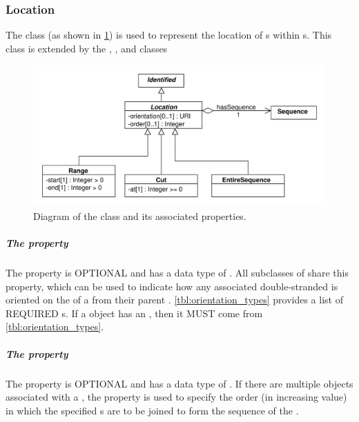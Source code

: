 
\subsubsection{Location}
\label{sec:Location}

The  class (as shown in \ref{uml:location}) is used to represent the location of s within s.  This class is extended by the , , and  classes

\begin{figure}[ht]
\begin{center}
\includegraphics[scale=0.6]{uml/location}
\caption[]{Diagram of the  class and its associated properties.}
\label{uml:location}
\end{center}
\end{figure} 

\subparagraph{The  property}
\label{sec:orientation:L}
The  property is OPTIONAL and has a data type of . All subclasses of  share this property, which can be used to indicate how any associated double-stranded  is oriented on the  of a  from their parent . \ref{tbl:orientation_types} provides a list of REQUIRED  s. If a  object has an , then it MUST come from \ref{tbl:orientation_types}.

\subparagraph{The  property}
\label{sec:order}
The  property is OPTIONAL and has a data type of .  If there are multiple  objects associated with a , the  property is used to specify the order (in increasing value) in which the specified s are to be joined to form the sequence of the .

